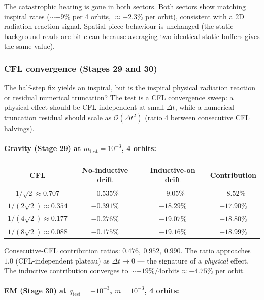 \documentclass[11pt,a4paper]{article}
\newcommand{\order}[1]{\mathcal{O}(#1)}
\begin{document}
The catastrophic heating is gone in both sectors.  Both sectors show
matching inspiral rates ($\sim -9\%$ per 4 orbits, $\approx -2.3\%$ per
orbit), consistent with a 2D radiation-reaction signal.  Spatial-piece
behaviour is unchanged (the static-background reads are bit-clean
because averaging two identical static buffers gives the same value).

\subsubsection{CFL convergence (Stages 29 and 30)}
\label{sec:stage_cfl_convergence}

The half-step fix yields an inspiral, but is the inspiral physical
radiation reaction or residual numerical truncation?  The test is a
CFL convergence sweep: a physical effect should be CFL-independent at
small $\Delta t$, while a numerical truncation residual should scale
as $\order{\Delta t^2}$ (ratio 4 between consecutive CFL halvings).

\paragraph{Gravity (Stage 29) at $m_{\mathrm{test}} = 10^{-3}$, 4 orbits:}

\begin{center}
\begin{tabular}{@{}cccc@{}}
\toprule
\textbf{CFL} & \textbf{No-inductive drift} & \textbf{Inductive-on drift} & \textbf{Contribution} \\
\midrule
$1/\sqrt{2}      \approx 0.707$ & $-0.535\%$ & $-9.05\%$  & $-8.52\%$ \\
$1/(2\sqrt{2})   \approx 0.354$ & $-0.391\%$ & $-18.29\%$ & $-17.90\%$ \\
$1/(4\sqrt{2})   \approx 0.177$ & $-0.276\%$ & $-19.07\%$ & $-18.80\%$ \\
$1/(8\sqrt{2})   \approx 0.088$ & $-0.175\%$ & $-19.16\%$ & $-18.99\%$ \\
\bottomrule
\end{tabular}
\end{center}

Consecutive-CFL contribution ratios: $0.476,\ 0.952,\ 0.990$.  The
ratio approaches $1.0$ (CFL-independent plateau) as $\Delta t \to 0$
--- the signature of a \emph{physical} effect.  The inductive
contribution converges to $\sim -19\%/4\mathrm{orbits} \approx -4.75\%$
per orbit.

\paragraph{EM (Stage 30) at $q_{\mathrm{test}} = -10^{-3}$, $m =
10^{-3}$, 4 orbits:}
\end{document}
